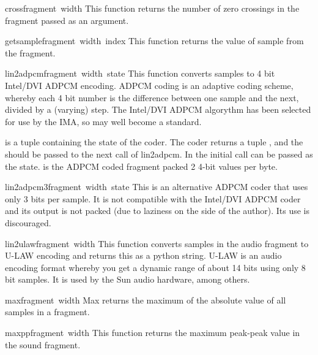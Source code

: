 \begin{funcdesc}{cross}{fragment\, width}
This function returns the number of zero crossings in the fragment
passed as an argument.
\end{funcdesc}

\begin{funcdesc}{getsample}{fragment\, width\, index}
This function returns the value of sample  from the fragment.
\end{funcdesc}

\begin{funcdesc}{lin2adpcm}{fragment\, width\, state}
This function converts samples to 4 bit Intel/DVI ADPCM encoding.
ADPCM coding is an adaptive coding scheme, whereby each 4 bit number
is the difference between one sample and the next, divided by a
(varying) step. The Intel/DVI ADPCM algorythm has been selected for
use by the IMA, so may well become a standard.

 is a tuple containing the state of the coder. The coder
returns a tuple , and the
 should be passed to the next call of lin2adpcm.  In the
initial call  can be passed as the state.  is
the ADPCM coded fragment packed 2 4-bit values per byte.
\end{funcdesc}

\begin{funcdesc}{lin2adpcm3}{fragment\, width\, state}
This is an alternative ADPCM coder that uses only 3 bits per sample.
It is not compatible with the Intel/DVI ADPCM coder and its output is
not packed (due to laziness on the side of the author). Its use is
discouraged.
\end{funcdesc}

\begin{funcdesc}{lin2ulaw}{fragment\, width}
This function converts samples in the audio fragment to U-LAW encoding
and returns this as a python string. U-LAW is an audio encoding format
whereby you get a dynamic range of about 14 bits using only 8 bit
samples. It is used by the Sun audio hardware, among others.
\end{funcdesc}

\begin{funcdesc}{max}{fragment\, width}
Max returns the maximum of the absolute value of all samples in a fragment.
\end{funcdesc}

\begin{funcdesc}{maxpp}{fragment\, width}
This function returns the maximum peak-peak value in the sound fragment.
\end{funcdesc}

